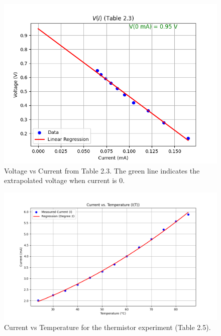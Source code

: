 \documentclass[journal]{IEEEtran}
\begin{document}
\begin{figure}[H]
    \centering
    \includegraphics[width=\linewidth]{output_plots/Voltage_vs_current_table_2_3.png}
    \caption{Voltage vs Current from Table 2.3. The green line indicates the extrapolated voltage when current is 0.}
\end{figure}
  
\begin{figure}[H]
    \centering
    \includegraphics[width=\linewidth]{output_plots/Current_vs_Temperature.png}
    \caption{Current vs Temperature for the thermistor experiment (Table 2.5).}
\end{figure}
  
\end{document}
